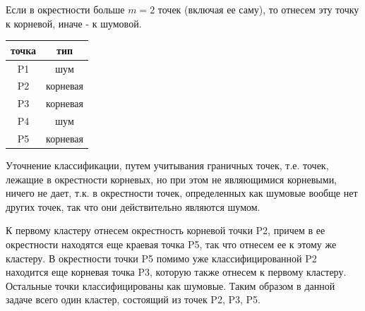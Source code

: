 Если в окрестности больше $m=2$ точек (включая ее саму), то отнесем эту точку к корневой, иначе - к шумовой.

\begin{center}
\begin{tabular}{ |c|c| } 
 \hline
 точка & тип \\\hline
 P1 & шум\\ 
 P2 & корневая\\ 
 P3 & корневая\\ 
 P4 & шум\\
 P5 & корневая\\
 \hline
\end{tabular}
\end{center}

Уточнение классификации, путем учитывания граничных точек, т.е. точек, лежащие в окрестности корневых, но при этом не являющимися корневыми, ничего не дает, т.к. в окрестности точек, определенных как шумовые вообще нет других точек, так что они действительно являются шумом.

К первому кластеру отнесем окрестность корневой точки P2, причем в ее окрестности находятся еще краевая точка P5, так что отнесем ее к этому же кластеру. В окрестности точки P5 помимо уже классифицированной P2 находится еще корневая точка P3, которую также отнесем к первому кластеру. Остальные точки классифицированы как шумовые. Таким образом в данной задаче всего один кластер, состоящий из точек P2, P3, P5.
